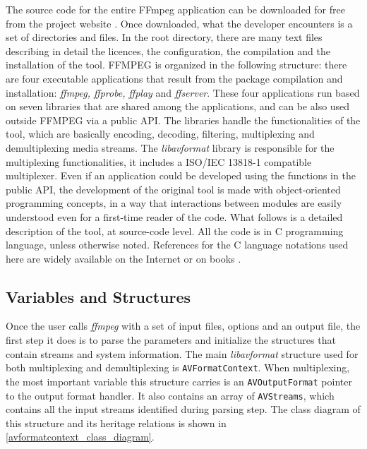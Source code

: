 \documentclass[
	12pt,				%
	openright,			%
	twoside,			%
	a4paper,			%
	brazil,
	french,				%
	english
	]{abntex2}
\begin{document}
The source code for the entire FFmpeg application can be downloaded for free from the project website \cite{ffmpeg}. Once downloaded, what the developer encounters is a set of directories and files. In the root directory, there are many text files describing in detail the licences, the configuration, the compilation and the installation of the tool. FFMPEG is organized in the following structure: there are four executable applications that result from the package compilation and installation: \textit{ffmpeg, ffprobe, ffplay} and \textit{ffserver}. These four applications run based on seven libraries that are shared among the applications, and can be also used outside FFMPEG via a public API. The libraries handle the functionalities of the tool, which are basically encoding, decoding, filtering, multiplexing and demultiplexing media streams. The \textit{libavformat} library is responsible for the multiplexing functionalities, it includes a ISO/IEC 13818-1 compatible multiplexer. Even if an application could be developed using the functions in the public API, the development of the original tool is made with object-oriented programming concepts, in a way that interactions between modules are easily understood even for a first-time reader of the code. What follows is a detailed description of the tool, at source-code level. All the code is in C programming language, unless otherwise noted. References for the C language notations used here are widely available on the Internet \cite{cpp_reference} or on books \cite{ritchie}.


\subsection{Variables and Structures}

Once the user calls \textit{ffmpeg} with a set of input files, options and an output file, the first step it does is to parse the parameters and initialize the structures that contain streams and system information. The main \textit{libavformat} structure used for both multiplexing and demultiplexing is \texttt{AVFormatContext}. When multiplexing, the most important variable this structure carries is an \texttt{AVOutputFormat} pointer to the output format handler. It also contains an array of \texttt{AVStreams}, which contains all the input streams identified during parsing step. The class diagram of this structure and its heritage relations is shown in \autoref{avformatcontext_class_diagram}.
\end{document}
